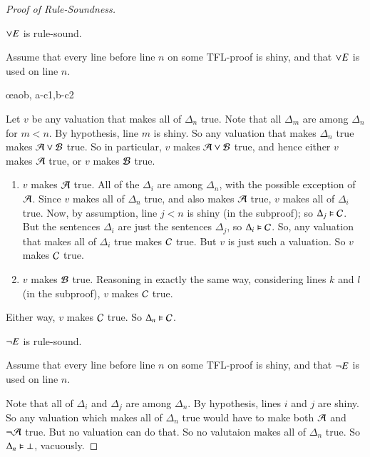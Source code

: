 \begin{proof}[Proof of Rule-Soundness]
    \begin{claim}[5]
        $\vee E$ is rule-sound.
    \end{claim}
    Assume that every line before line $n$ on some TFL-proof is shiny, and that $\vee E$ is used on line $n$.
	\begin{fitchproof}
	   \open
	   \close
	   \open
	   \close
	   \oe{aob, a-c1,b-c2}
   \end{fitchproof}
    Let $v$ be any valuation that makes all of $\Delta_n$ true. Note that all $\Delta_m$ are among $\Delta_n$ for $m < n$. By hypothesis, line $m$ is shiny. So any valuation that makes $\Delta_n$ true makes $\mathcal{A}\vee\mathcal{B}$ true. So in particular, $v$ makes $\mathcal{A}\vee \mathcal{B}$ true, and hence either $v$ makes $\mathcal{A}$ true, or $v$ makes $\mathcal{B}$ true. \begin{enumerate}
        \item $v$ makes $\mathcal{A}$ true. All of the $\Delta_i$ are among $\Delta_n$, with the possible exception of $\mathcal{A}$. Since $v$ makes all of $\Delta_n$ true, and also makes $\mathcal{A}$ true, $v$ makes all of $\Delta_i$ true. Now, by assumption, line $j < n$ is shiny (in the subproof); so $\Delta_j\vDash \mathcal{C}$. But the sentences $\Delta_i$ are just the sentences $\Delta_j$, so $\Delta_i \vDash \mathcal{C}$. So, any valuation that makes all of $\Delta_i$ true makes $\mathcal{C}$ true. But $v$ is just such a valuation. So $v$ makes $\mathcal{C}$ true.
        \item $v$ makes $\mathcal{B}$ true. Reasoning in exactly the same way, considering lines $k$ and $l$ (in the subproof), $v$ makes $\mathcal{C}$ true.
    \end{enumerate}
    Either way, $v$ makes $\mathcal{C}$ true. So $\Delta_n\vDash \mathcal{C}$.


    \begin{claim}[6]
        $\neg E$ is rule-sound.
    \end{claim}
    Assume that every line before line $n$ on some TFL-proof is shiny, and that $\neg E$ is used on line $n$.
    \begin{fitchproof}
         
    \end{fitchproof}
    Note that all of $\Delta_i$ and $\Delta_j$ are among $\Delta_n$. By hypothesis, lines $i$ and $j$ are shiny. So any valuation which makes all of $\Delta_n$ true would have to make both $\mathcal{A}$ and $\neg\mathcal{A}$ true. But no valuation can do that. So no valutaion makes all of $\Delta_n$ true. So $\Delta_n \vDash \bot$, vacuously.



\end{proof}
